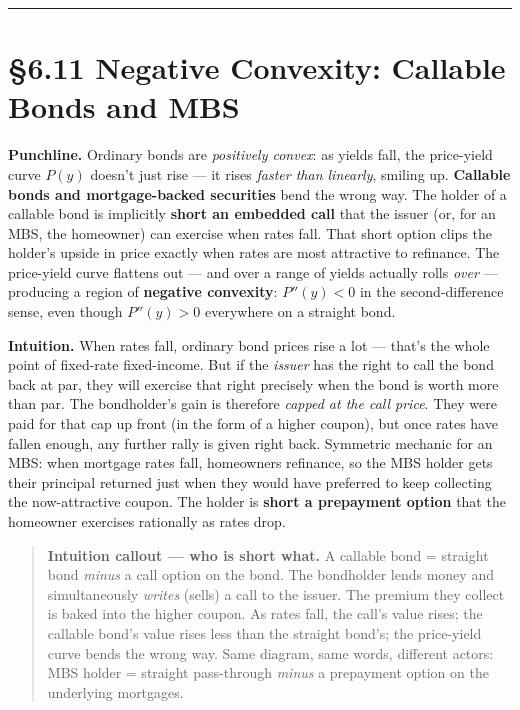 \documentclass[
  10pt,
  twoside]{book}
\begin{document}
\begin{center}\rule{0.5\linewidth}{0.5pt}\end{center}

\section{§6.11 Negative Convexity: Callable Bonds and
MBS}\label{negative-convexity-callable-bonds-and-mbs}

\textbf{Punchline.} Ordinary bonds are \emph{positively convex}: as
yields fall, the price-yield curve \(P(y)\) doesn't just rise --- it
rises \emph{faster than linearly}, smiling up. \textbf{Callable bonds
and mortgage-backed securities} bend the wrong way. The holder of a
callable bond is implicitly \textbf{short an embedded call} that the
issuer (or, for an MBS, the homeowner) can exercise when rates fall.
That short option clips the holder's upside in price exactly when rates
are most attractive to refinance. The price-yield curve flattens out ---
and over a range of yields actually rolls \emph{over} --- producing a
region of \textbf{negative convexity}: \(P''(y) < 0\) in the
second-difference sense, even though \(P''(y) > 0\) everywhere on a
straight bond.

\textbf{Intuition.} When rates fall, ordinary bond prices rise a lot ---
that's the whole point of fixed-rate fixed-income. But if the
\emph{issuer} has the right to call the bond back at par, they will
exercise that right precisely when the bond is worth more than par. The
bondholder's gain is therefore \emph{capped at the call price}. They
were paid for that cap up front (in the form of a higher coupon), but
once rates have fallen enough, any further rally is given right back.
Symmetric mechanic for an MBS: when mortgage rates fall, homeowners
refinance, so the MBS holder gets their principal returned just when
they would have preferred to keep collecting the now-attractive coupon.
The holder is \textbf{short a prepayment option} that the homeowner
exercises rationally as rates drop.

\begin{quote}
\textbf{Intuition callout --- who is short what.} A callable bond =
straight bond \emph{minus} a call option on the bond. The bondholder
lends money and simultaneously \emph{writes} (sells) a call to the
issuer. The premium they collect is baked into the higher coupon. As
rates fall, the call's value rises; the callable bond's value rises less
than the straight bond's; the price-yield curve bends the wrong way.
Same diagram, same words, different actors: MBS holder = straight
pass-through \emph{minus} a prepayment option on the underlying
mortgages.
\end{quote}
\end{document}
